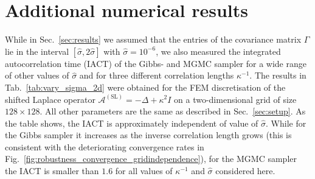 \documentclass[11pt,english]{article}
\theoremstyle{plain}
\theoremstyle{plain}
\theoremstyle{plain}
\theoremstyle{plain}
\numberwithin{equation}{section}
\newcommand{\rev}[1]{#1}
\begin{document}
\rev{\section{Additional numerical results\label{subsec:additional_results}}
While in Sec.~\ref{sec:results} we assumed that the entries of the covariance matrix $\Gamma$ lie in the interval $[\widehat{\sigma},2\widehat{\sigma}]$ with $\widehat{\sigma}=10^{-6}$, we also measured the integrated autocorrelation time (IACT) of the Gibbs- and MGMC sampler for a wide range of other values of $\widehat{\sigma}$ and for three different correlation lengths $\kappa^{-1}$. The results in Tab.~\ref{tab:vary_sigma_2d} were obtained for the FEM discretisation of the shifted Laplace operator $\mathcal{A}^{(\mathrm{SL})}=-\Delta + \kappa^2 I$ on a two-dimensional grid of size $128\times 128$. All other parameters are the same as described in Sec.~\ref{sec:setup}. As the table shows, the IACT is approximately independent of value of $\widehat{\sigma}$. While for the Gibbs sampler it increases as the inverse correlation length grows (this is consistent with the deteriorating convergence rates in Fig.~\ref{fig:robustness_convergence_gridindependence}), for the MGMC sampler the IACT is smaller than $1.6$ for all values of $\kappa^{-1}$ and $\widehat{\sigma}$ considered here.}
\end{document}
